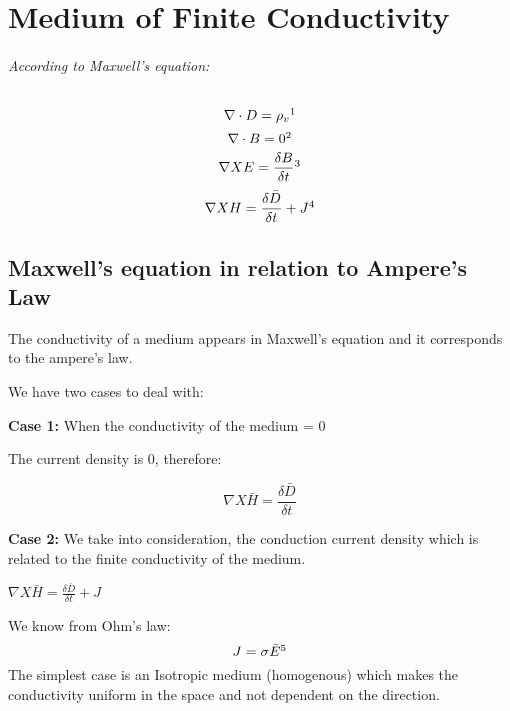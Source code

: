 \chapter{Medium of Finite Conductivity}\label{lec:lec25}
\subparagraph{According to Maxwell's equation:}
\begin{equation}
\nabla\cdot D = \rho_{v}\footnotemark
\end{equation}
\begin{equation}	 
\nabla\cdot B = 0\footnotemark
\end{equation}
\begin{equation}
\nabla X E = \frac{\delta B}{\delta t}\footnotemark
\end{equation}
\begin{equation}
\nabla XH =\frac{\delta \bar{D}}{\delta t} + J\footnotemark
\end{equation}
\section{Maxwell's equation in relation to Ampere's Law}
The conductivity of a medium appears in Maxwell's equation and it corresponds to the ampere's law.

We have two cases to deal with:

\textbf{Case 1:} When the conductivity of the medium = 0 

The current density is 0, therefore:

\begin{equation}
\nabla X \bar{H} = \frac{\delta \bar {D}}{\delta t}
\end{equation}

\textbf{Case 2:} We take into consideration, the conduction current density which is related to the finite conductivity of the medium.

\begin{center}
$\nabla X \bar{H} = \frac{\delta \bar{D}}{\delta t} + J$
\end{center}

We know from Ohm's law:
\begin{equation}
J = \sigma\bar{E}\footnotemark
\end{equation}
The simplest case is an Isotropic medium (homogenous) which makes the conductivity uniform in the space and not dependent on the direction.

